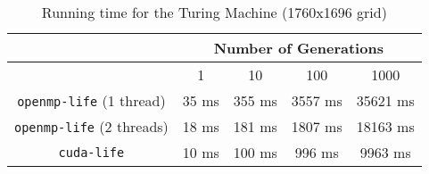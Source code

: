 \begin{table}[H]
	\label{tab:biggrid}
\caption{Running time for the Turing Machine (1760x1696 grid)}
	\begin{tabular}{c|c|c|c|c|}
	& \multicolumn{4}{c}{\bf Number of Generations} \\ \hline
				& 1 & 10 & 100 & 1000
				\\ \hline
	{\tt openmp-life} (1 thread) & 35 ms & 355 ms & 3557 ms & 35621 ms \\ \hline
	{\tt openmp-life} (2 threads) & 18 ms & 181 ms & 1807 ms & 18163 ms \\ \hline
	{\tt cuda-life}   & 10 ms & 100 ms & 996 ms  & 9963 ms    \\ \hline
	\end{tabular}
\end{table}
